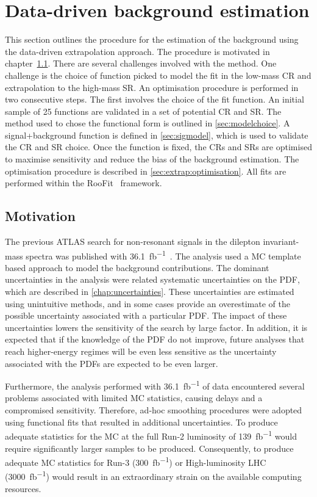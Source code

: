 \chapter{Data-driven background estimation}\label{chap:bkgmodel}
This section outlines the procedure for the estimation of the background using the data-driven extrapolation approach. The procedure is motivated in chapter~\cref{sec:bkgmodel:motivation}. There are several challenges involved with the method. One challenge is the choice of function picked to model the fit in the low-mass CR and extrapolation to the high-mass SR. An optimisation procedure is performed in two consecutive steps. The first involves the choice of the fit function. An initial sample of 25 functions are validated in a set of potential CR and SR. The method used to chose the functional form is outlined in \cref{sec:modelchoice}. A signal+background function is defined in \cref{sec:sigmodel}, which is used to validate the CR and SR choice. Once the function is fixed, the CRs and SRs are optimised to maximise sensitivity and reduce the bias of the background estimation. The optimisation procedure is described in \cref{sec:extrap:optimisation}. All fits are performed within the RooFit~\cite{RooFit} framework.

\section{Motivation}\label{sec:bkgmodel:motivation}
The previous ATLAS search for non-resonant signals in the dilepton invariant-mass spectra was published with \SI{36.1}{\femto\barn^{-1}}~\cite{EXOT-2016-05}. The analysis used a MC template based approach to model the background contributions. The dominant uncertainties in the analysis were related systematic uncertainties on the PDF, which are described in \cref{chap:uncertainties}. These uncertainties are estimated using unintuitive methods, and in some cases provide an overestimate of the possible uncertainty associated with a particular PDF. The impact of these uncertainties lowers the sensitivity of the search by large factor. In addition, it is expected that if the knowledge of the PDF do not improve, future analyses that reach higher-energy regimes will be even less sensitive as the uncertainty associated with the PDFs are expected to be even larger. 

Furthermore, the analysis performed with \SI{36.1}{\femto\barn^{-1}} of data encountered several problems associated with limited MC statistics, causing delays and a compromised sensitivity. Therefore, ad-hoc smoothing procedures were adopted using functional fits that resulted in additional uncertainties. To produce adequate statistics for the MC at the full Run-2 luminosity of \SI{139}{\femto\barn^{-1}} would require significantly larger samples to be produced. Consequently, to produce adequate MC statistics for Run-3 (\SI{300}{\femto\barn^{-1}}) or High-luminosity LHC (\SI{3000}{\femto\barn^{-1}}) would result in an extraordinary strain on the available computing resources. 

